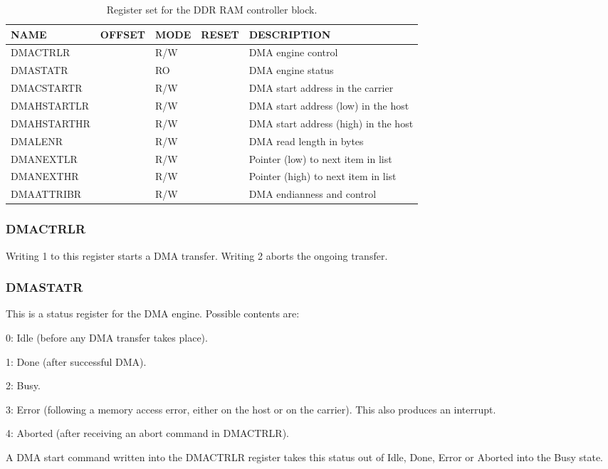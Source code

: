 \documentclass[10pt,a4paper]{cerndoc}
\begin{document}
\begin{table}[htbp]
  \centering
  \begin{tabularx}{\textwidth}{|l|r|l|l|X|}                                                     \hline
    \textbf{NAME}  & \textbf{OFFSET} & \textbf{MODE} & \textbf{RESET} & \textbf{DESCRIPTION}  \\ \hline \hline
    DMACTRLR       & & R/W & & DMA engine control                                             \\ \hline
    DMASTATR       & & RO  & & DMA engine status                                              \\ \hline
    DMACSTARTR     & & R/W & & DMA start address in the carrier                               \\ \hline
    DMAHSTARTLR    & & R/W & & DMA start address (low) in the host                            \\ \hline
    DMAHSTARTHR    & & R/W & & DMA start address (high) in the host                           \\ \hline
    DMALENR        & & R/W & & DMA read length in bytes                                       \\ \hline
    DMANEXTLR      & & R/W & & Pointer (low) to next item in list                             \\ \hline
    DMANEXTHR      & & R/W & & Pointer (high) to next item in list                            \\ \hline
    DMAATTRIBR     & & R/W & & DMA endianness and control                                     \\ \hline
  \end{tabularx}
  \caption{Register set for the DDR RAM controller block.}
  \label{tab:ddr_control}
\end{table}

\subsubsection{DMACTRLR}
Writing 1 to this register starts a DMA transfer. Writing 2 aborts the ongoing transfer.

\subsubsection{DMASTATR}
This is a status register for the DMA engine. Possible contents are:
\begin{packed_item}
\item 0: Idle (before any DMA transfer takes place).
\item 1: Done (after successful DMA).
\item 2: Busy.
\item 3: Error (following a memory access error, either on the host or on the carrier). This also produces an interrupt.
\item 4: Aborted (after receiving an abort command in DMACTRLR).
\end{packed_item}
A DMA start command written into the DMACTRLR register takes this status out of Idle, Done, Error or Aborted into the Busy state.
\end{document}
